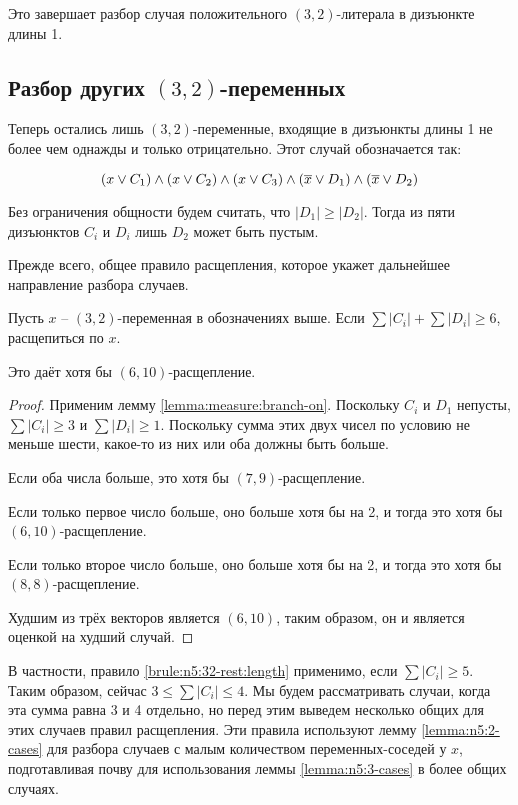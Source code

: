 Это завершает разбор случая положительного $(3,2)$-литерала в дизъюнкте длины 1.

\subsection{Разбор других $(3,2)$-переменных}
\label{subsec:n5:32-rest}

Теперь остались лишь $(3,2)$-переменные, входящие в дизъюнкты длины 1 не более чем однажды и только отрицательно. Этот случай обозначается так:

$$
 (x \vee C_1) \wedge (x \vee C_2) \wedge (x \vee C_3) \wedge (\overline{x} \vee D_1) \wedge (\overline{x} \vee D_2)
$$

Без ограничения общности будем считать, что $|D_1| \geq |D_2|$. Тогда из пяти дизъюнктов $C_i$ и $D_i$ лишь $D_2$ может быть пустым.

Прежде всего, общее правило расщепления, которое укажет дальнейшее направление разбора случаев.

\begin{brule}
 Пусть $x$ -- $(3,2)$-переменная в обозначениях выше. Если $\sum |C_i| + \sum |D_i| \geq 6$, расщепиться по $x$.

 Это даёт хотя бы $(6,10)$-расщепление.
 \label{brule:n5:32-rest:length}
\end{brule}

\begin{proof}
 Применим лемму \ref{lemma:measure:branch-on}. Поскольку $C_i$ и $D_1$ непусты, $\sum |C_i| \geq 3$ и $\sum |D_i| \geq 1$. Поскольку сумма этих двух чисел по условию не меньше шести, какое-то из них или оба должны быть больше.

 Если оба числа больше, это хотя бы $(7,9)$-расщепление.

 Если только первое число больше, оно больше хотя бы на 2, и тогда это хотя бы $(6,10)$-расщепление.

 Если только второе число больше, оно больше хотя бы на 2, и тогда это хотя бы $(8,8)$-расщепление.

 Худшим из трёх векторов является $(6,10)$, таким образом, он и является оценкой на худший случай.
\end{proof}

В частности, правило \ref{brule:n5:32-rest:length} применимо, если $\sum |C_i| \geq 5$. Таким образом, сейчас $3 \leq \sum |C_i| \leq 4$. Мы будем рассматривать случаи, когда эта сумма равна 3 и 4 отдельно, но перед этим выведем несколько общих для этих случаев правил расщепления.
Эти правила используют лемму \ref{lemma:n5:2-cases} для разбора случаев с малым количеством переменных-соседей у $x$, подготавливая почву для использования леммы \ref{lemma:n5:3-cases} в более общих случаях.

